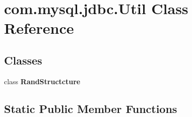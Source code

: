 \hypertarget{classcom_1_1mysql_1_1jdbc_1_1_util}{}\section{com.\+mysql.\+jdbc.\+Util Class Reference}
\label{classcom_1_1mysql_1_1jdbc_1_1_util}
\subsection*{Classes}
\begin{DoxyCompactItemize}
\item 
class {\bfseries Rand\+Structcture}
\end{DoxyCompactItemize}
\subsection*{Static Public Member Functions}
